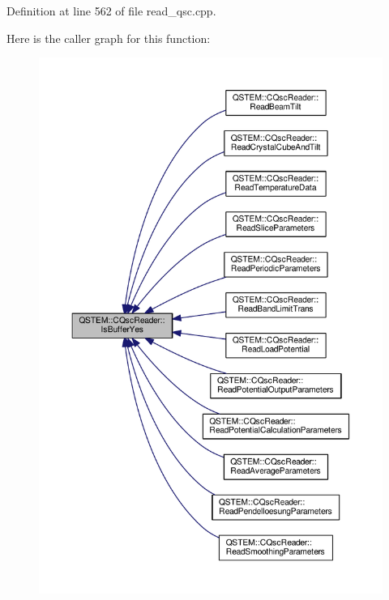 Definition at line 562 of file read\-\_\-qsc.\-cpp.



Here is the caller graph for this function\-:
\nopagebreak
\begin{figure}[H]
\begin{center}
\leavevmode
\includegraphics[width=350pt]{class_q_s_t_e_m_1_1_c_qsc_reader_a4bc85c76ea39a73397f84042a2094109_icgraph}
\end{center}
\end{figure}


